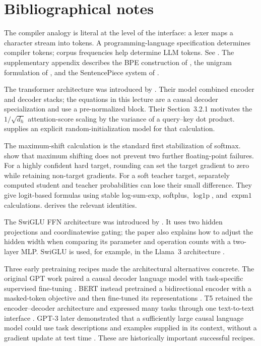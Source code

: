 \documentclass[11pt,twoside]{article}
\theoremstyle{plain}
\theoremstyle{definition}
\theoremstyle{remark}
\begin{document}
\printendnotes

\section*{Bibliographical notes}

The compiler analogy is literal at the level of the interface: a lexer maps a
character stream into tokens. A programming-language specification determines
compiler tokens; corpus frequencies help determine LLM tokens. See
\citet{aho2006}. The supplementary appendix describes the BPE construction of
\citet{sennrich2016}, the unigram formulation of \citet{kudo2018}, and the
SentencePiece system of \citet{kudorichardson2018}.

The transformer architecture was introduced by \citet{vaswani2017}. Their
model combined encoder and decoder stacks; the equations in this lecture are a
causal decoder specialization and use a pre-normalized block.
Their Section~3.2.1 motivates the $1/\sqrt{d_h}$ attention-score scaling by
the variance of a query--key dot product.
 supplies an explicit random-initialization model
for that calculation.

The maximum-shift calculation is the standard first stabilization of softmax.
\citet{barron2026} show that maximum shifting does not prevent two further
floating-point failures. For a highly confident hard target, rounding can set
the target gradient to zero while retaining non-target gradients. For a soft
teacher target, separately computed student and teacher probabilities can lose
their small difference. They give logit-based formulas using stable
log-sum-exp, softplus, \(\operatorname{log1p}\), and
\(\operatorname{expm1}\) calculations.  derives
the relevant identities.

The SwiGLU FFN architecture was introduced by \citet{shazeer2020}. It uses
two hidden projections and coordinatewise gating; the paper also explains how
to adjust the hidden width when comparing its parameter and operation counts
with a two-layer MLP. SwiGLU is used, for example,
in the Llama~3 architecture \citep{grattafiori2024}.

Three early pretraining recipes made the architectural alternatives concrete.
The original GPT work paired a causal decoder language model with
task-specific supervised fine-tuning \citep{radford2018}. BERT instead
pretrained a bidirectional encoder with a masked-token objective and then
fine-tuned its representations \citep{devlin2019}. T5 retained the
encoder--decoder architecture and expressed many tasks through one text-to-text
interface \citep{raffel2020}. GPT-3 later demonstrated that a sufficiently
large causal language model could use task descriptions and examples supplied
in its context, without a gradient update at test time \citep{brown2020}.
These are historically important successful recipes.
\end{document}
